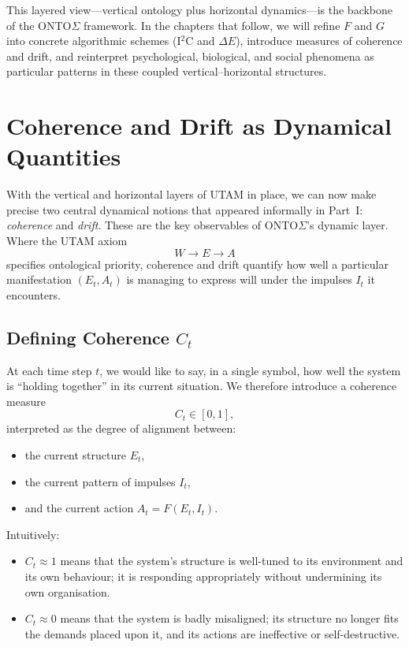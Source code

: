 \documentclass[12pt,a4paper]{report}
\newcommand{\Will}{W}
\newcommand{\Struct}{E}
\newcommand{\Act}{A}
\begin{document}
This layered view---vertical ontology plus horizontal dynamics---is the backbone of the ONTO$\Sigma$ framework. In the chapters that follow, we will refine \(F\) and \(G\) into concrete algorithmic schemes (I$^2$C and $\Delta E$), introduce measures of coherence and drift, and reinterpret psychological, biological, and social phenomena as particular patterns in these coupled vertical--horizontal structures.


\chapter{Coherence and Drift as Dynamical Quantities}

With the vertical and horizontal layers of UTAM in place, we can now make precise two central dynamical notions that appeared informally in Part~I: \emph{coherence} and \emph{drift}. These are the key observables of ONTO$\Sigma$'s dynamic layer. Where the UTAM axiom
\[
    \Will \to \Struct \to \Act
\]
specifies ontological priority, coherence and drift quantify how well a particular manifestation \((E_t, A_t)\) is managing to express will under the impulses \(I_t\) it encounters.

\section{Defining Coherence \texorpdfstring{\(C_t\)}{Ct}}

At each time step \(t\), we would like to say, in a single symbol, how well the system is ``holding together'' in its current situation. We therefore introduce a coherence measure
\[
    C_t \in [0,1],
\]
interpreted as the degree of alignment between:

\begin{itemize}[leftmargin=2em]
    \item the current structure \(E_t\),
    \item the current pattern of impulses \(I_t\),
    \item and the current action \(A_t = F(E_t, I_t)\).
\end{itemize}

Intuitively:

\begin{itemize}[leftmargin=2em]
    \item \(C_t \approx 1\) means that the system's structure is well-tuned to its environment and its own behaviour; it is responding appropriately without undermining its own organisation.
    \item \(C_t \approx 0\) means that the system is badly misaligned; its structure no longer fits the demands placed upon it, and its actions are ineffective or self-destructive.
\end{itemize}
\end{document}

